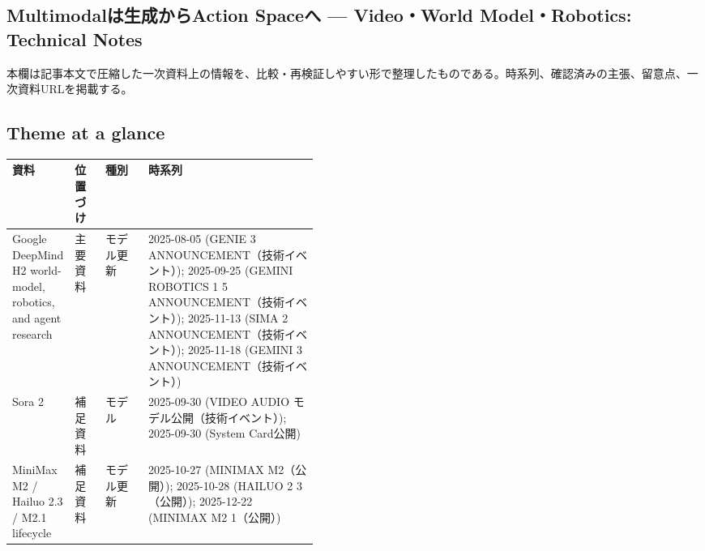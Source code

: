\subsection*{Multimodalは生成からAction Spaceへ — Video・World Model・Robotics: Technical Notes}
本欄は記事本文で圧縮した一次資料上の情報を、比較・再検証しやすい形で整理したものである。時系列、確認済みの主張、留意点、一次資料URLを掲載する。
\medskip
\subsection*{Theme at a glance}
\begin{center}
\footnotesize
\begin{tabularx}{\linewidth}{@{}p{0.20\linewidth}p{0.10\linewidth}p{0.14\linewidth}X@{}}
\toprule
資料 & 位置づけ & 種別 & 時系列 \\
\midrule
Google DeepMind H2 world-model, robotics, and agent research & 主要資料 & モデル更新 & 2025-08-05 (GENIE 3 ANNOUNCEMENT（技術イベント）); 2025-09-25 (GEMINI ROBOTICS 1 5 ANNOUNCEMENT（技術イベント）); 2025-11-13 (SIMA 2 ANNOUNCEMENT（技術イベント）); 2025-11-18 (GEMINI 3 ANNOUNCEMENT（技術イベント）)  \\
Sora 2 & 補足資料 & モデル & 2025-09-30 (VIDEO AUDIO モデル公開（技術イベント）); 2025-09-30 (System Card公開)  \\
MiniMax M2 / Hailuo 2.3 / M2.1 lifecycle & 補足資料 & モデル更新 & 2025-10-27 (MINIMAX M2（公開）); 2025-10-28 (HAILUO 2 3（公開）); 2025-12-22 (MINIMAX M2 1（公開）)  \\
\bottomrule
\end{tabularx}
\end{center}
\normalsize

